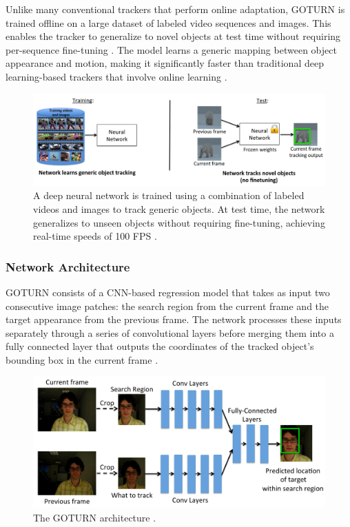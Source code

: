 Unlike many conventional trackers that perform online adaptation, GOTURN is trained offline on a large dataset of labeled video sequences and images. This enables the tracker to generalize to novel objects at test time without requiring per-sequence fine-tuning \cite{held2016learning}. The model learns a generic mapping between object appearance and motion, making it significantly faster than traditional deep learning-based trackers that involve online learning \cite{held2016learning}.

\begin{figure}[ht]
    \centering
    \includegraphics[width=1\linewidth]{images/GOTURN_OVERVIEW.png}
    \caption{A deep neural network is trained using a combination of labeled videos and images to track generic objects. At test time, the network generalizes to unseen objects without requiring fine-tuning, achieving real-time speeds of 100 FPS \cite{held2016learning}.}
    \label{fig:goturn_overview}
\end{figure}

\subsubsection{Network Architecture}
GOTURN consists of a CNN-based regression model that takes as input two consecutive image patches: the search region from the current frame and the target appearance from the previous frame. The network processes these inputs separately through a series of convolutional layers before merging them into a fully connected layer that outputs the coordinates of the tracked object's bounding box in the current frame \cite{held2016learning}.

\begin{figure}[ht]
    \centering
    \includegraphics[width=1\linewidth]{images/goturn-architecture.png}
    \caption{The GOTURN architecture \cite{held2016learning}.}
    \label{fig:goturn_architecture}
\end{figure}


